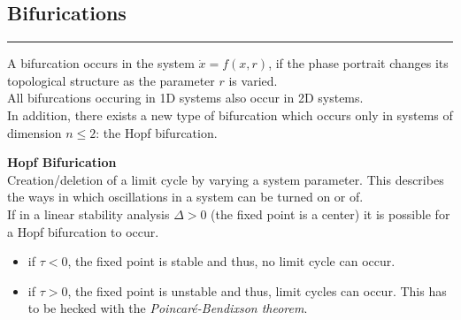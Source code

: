 \subsection{Bifurications}
\noindent\rule[\linienAbstand]{\linewidth}{\linienDicke}
A bifurcation occurs in the system $\dot{x} = f(x, r)$, if the phase portrait changes its topological structure as the parameter $r$ is varied.\\

All bifurcations occuring in 1D systems also occur in 2D systems.\\
In addition, there exists a new type of bifurcation which occurs only in systems of dimension $n \leq 2$: the Hopf bifurcation.

\textbf{Hopf Bifurication}\\
Creation/deletion of a limit cycle by varying a system parameter. This describes the ways in which oscillations in a system can be turned on or of.\\
If in a linear stability analysis $\Delta > 0$ (the fixed point is a center) it is possible for a Hopf bifurcation to occur.
\begin{itemize}
  \item if $\tau < 0$, the fixed point is stable and thus, no limit cycle can occur.
  \item if $\tau > 0$, the fixed point is unstable and thus, limit cycles can occur. This has to be hecked with the \emph{Poincaré-Bendixson theorem}.
\end{itemize}
